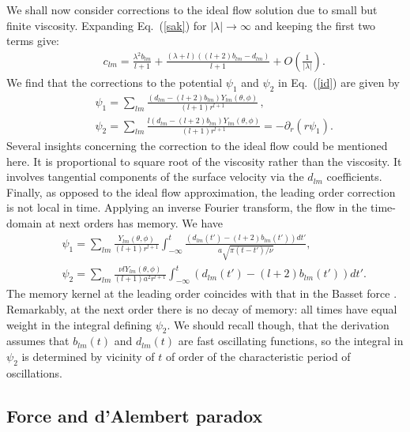 \documentclass[aps,prx,twocolumn,amsmath,amssymb,amsfonts]{revtex4-2}
\begin{document}
{{We shall now consider corrections to the ideal flow solution due to small but finite viscosity. Expanding Eq.~(\ref{sak}) for $|\lambda|\rightarrow \infty$ and keeping the first two terms give:
\begin{eqnarray}&&\!\!\!\!\!\!
c_{lm}\!=\! \frac{ \lambda^2 b_{lm}}{l\!+\!1}\!+\!\frac{(\lambda\!+\!l) \left((l\!+\!2)b_{lm}\!-\!d_{lm}\right)}{l\!+\!1}\!+\!O\left(\frac{1}{|\lambda|}\right). \label{cb}
\end{eqnarray}
We find that the corrections to the potential $\psi_1$ and $\psi_2$ in Eq.~(\ref{id}) are given by
\begin{eqnarray}&&\!\!\!\!\!\!\!\!\!
\psi_1=\sum_{l m}\frac{\left(d_{lm}\!-\! (l\!+\!2)b_{lm}\right)Y_{lm}(\theta, \phi)}{(l\!+\!1)r^{l+1}}\,,
\\&&\!\!\!\!\!\!\!\!\!
\psi_2=\sum_{l m}\frac{l\left(d_{lm}\!-\! (l\!+\!2)b_{lm}\right)Y_{lm}(\theta, \phi)}{(l\!+\!1)r^{l+1}}=-\partial_r(r\psi_1)\nonumber.
\end{eqnarray}
Several insights concerning the correction to the ideal flow could be mentioned here. It is proportional to square root of the viscosity rather than the viscosity. It involves tangential components of the surface velocity via the $d_{lm}$ coefficients. Finally, as opposed to the ideal flow approximation, the leading order correction is not local in time. Applying an inverse Fourier transform, the flow in the time-domain at next orders has memory. We have
\begin{eqnarray}&&
\psi_1\!=\!\sum_{l m}\!\frac{Y_{lm}(\theta, \phi)}{(l\!+\!1)r^{l+1}}\int_{-\infty}^t \!\!\frac{ \left(d_{lm}(t')\!-\! (l\!+\!2)b_{lm}(t')\right)dt'}{a\sqrt{\pi(t\!-\!t')/\nu}},\nonumber
\\&&
\psi_2\!=\!\sum_{l m}\frac{\nu lY_{lm}(\theta, \phi)}{(l\!+\!1)a^2 r^{l+1}}\int_{-\infty}^t \left(d_{lm}(t')\!-\! (l\!+\!2)b_{lm}(t')\right)dt'.\nonumber
\end{eqnarray}
The memory kernel at the leading order coincides with that in the Basset force \cite{kim}. Remarkably, at the next order there is no decay of memory: all times have equal weight in the integral defining $\psi_2$. We should recall though, that the derivation assumes that $b_{lm}(t)$ and $d_{lm}(t)$ are fast oscillating functions, so the integral in $\psi_2$ is determined by vicinity of $t$ of order of the characteristic period of oscillations.

\subsection{Force and d'Alembert paradox} \label{focid}

}}
\end{document}
